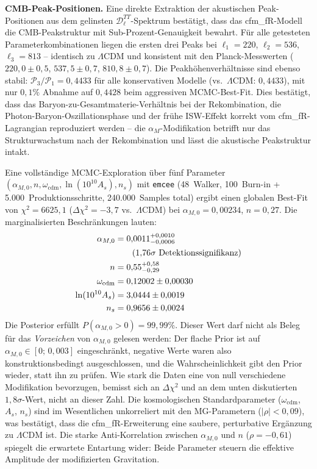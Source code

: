 \documentclass[11pt,a4paper]{article}
\begin{document}
\textbf{CMB-Peak-Positionen.} Eine direkte Extraktion der akustischen Peak-Positionen aus dem gelinsten $\mathcal{D}_\ell^{TT}$-Spektrum best\"atigt, dass das cfm\_fR-Modell die CMB-Peakstruktur mit Sub-Prozent-Genauigkeit bewahrt. F\"ur alle getesteten Parameterkombinationen liegen die ersten drei Peaks bei $\ell_1 = 220$, $\ell_2 = 536$, $\ell_3 = 813$ -- identisch zu $\Lambda$CDM und konsistent mit den Planck-Messwerten ($220{,}0 \pm 0{,}5$, $537{,}5 \pm 0{,}7$, $810{,}8 \pm 0{,}7$). Die Peakh\"ohenverh\"altnisse sind ebenso stabil: $\mathcal{P}_3/\mathcal{P}_1 = 0{,}4433$ f\"ur alle konservativen Modelle (vs.\ $\Lambda$CDM: $0{,}4433$), mit nur $0{,}1\%$ Abnahme auf $0{,}4428$ beim aggressiven MCMC-Best-Fit. Dies best\"atigt, dass das Baryon-zu-Gesamtmaterie-Verh\"altnis bei der Rekombination, die Photon-Baryon-Oszillationsphase und der fr\"uhe ISW-Effekt korrekt vom cfm\_fR-Lagrangian reproduziert werden -- die $\alpha_M$-Modifikation betrifft nur das Strukturwachstum nach der Rekombination und l\"asst die akustische Peakstruktur intakt.

Eine vollst\"andige MCMC-Exploration \"uber f\"unf Parameter $(\alpha_{M,0}, n, \omega_{\mathrm{cdm}}, \ln(10^{10}A_s), n_s)$ mit \texttt{emcee} (48~Walker, 100~Burn-in + 5.000~Produktionsschritte, 240.000~Samples total) ergibt einen globalen Best-Fit von $\chi^2 = 6625{,}1$ ($\Delta\chi^2 = -3{,}7$ vs.\ $\Lambda$CDM) bei $\alpha_{M,0} = 0{,}00234$, $n = 0{,}27$. Die marginalisierten Beschr\"ankungen lauten:
\begin{align}
\alpha_{M,0} &= 0{,}0011^{+0{,}0010}_{-0{,}0006} \notag \\
&\qquad (1{,}76\sigma \text{ Detektionssignifikanz}) \notag \\
n &= 0{,}55^{+0{,}58}_{-0{,}29} \notag \\
\omega_{\mathrm{cdm}} &= 0{,}12002 \pm 0{,}00030 \notag \\
\ln(10^{10}A_s) &= 3{,}0444 \pm 0{,}0019 \notag \\
n_s &= 0{,}9656 \pm 0{,}0024 \notag
\end{align}
Die Posterior erf\"ullt $P(\alpha_{M,0} > 0) = 99{,}99\%$. Dieser Wert darf nicht als Beleg f\"ur das \textit{Vorzeichen} von $\alpha_{M,0}$ gelesen werden: Der flache Prior ist auf $\alpha_{M,0} \in [0;\,0{,}003]$ eingeschr\"ankt, negative Werte waren also konstruktionsbedingt ausgeschlossen, und die Wahrscheinlichkeit gibt den Prior wieder, statt ihn zu pr\"ufen. Wie stark die Daten eine von null verschiedene Modifikation bevorzugen, bemisst sich an $\Delta\chi^2$ und an dem unten diskutierten $1{,}8\sigma$-Wert, nicht an dieser Zahl. Die kosmologischen Standardparameter ($\omega_{\mathrm{cdm}}$, $A_s$, $n_s$) sind im Wesentlichen unkorreliert mit den MG-Parametern ($|\rho| < 0{,}09$), was best\"atigt, dass die cfm\_fR-Erweiterung eine saubere, perturbative Erg\"anzung zu $\Lambda$CDM ist. Die starke Anti-Korrelation zwischen $\alpha_{M,0}$ und $n$ ($\rho = -0{,}61$) spiegelt die erwartete Entartung wider: Beide Parameter steuern die effektive Amplitude der modifizierten Gravitation.
\end{document}
